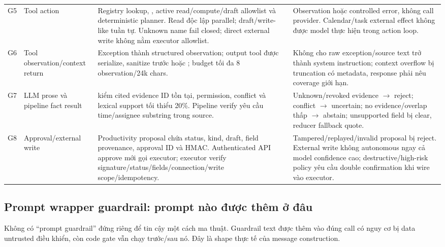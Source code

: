 \documentclass[11pt,a4paper]{article}
\newcommand{\code}[1]{\texttt{\detokenize{#1}}}
\begin{document}
\begin{longtable}{p{1.0cm}p{2.75cm}p{3.55cm}p{4.55cm}}
G5 & Tool action & Registry lookup, \code{evaluate\_tool()}, active read/compute/draft allowlist và deterministic planner. Read độc lập parallel; draft/write-like tuần tự. Unknown name fail closed; direct external write không nằm executor allowlist. & Observation \code{blocked} hoặc controlled error, không call provider. Calendar/task external effect không được model thực hiện trong action loop. \\
G6 & Tool observation/context return & Exception thành structured observation; output tool được serialize, sanitize trước \code{<observations>} hoặc \code{<tu\_lieu>}; budget tối đa 8 observation/24k chars. & Không cho raw exception/source text trở thành system instruction; context overflow bị truncation có metadata, response phải nêu coverage giới hạn. \\
G7 & LLM prose và pipeline fact result & \code{ground\_candidate()} kiểm cited evidence ID tồn tại, permission, conflict và lexical support tối thiểu 20\%. Pipeline verify yêu cầu time/assignee substring trong source. & Unknown/revoked evidence $\rightarrow$ reject; conflict $\rightarrow$ uncertain; no evidence/overlap thấp $\rightarrow$ abstain; unsupported field bị clear, reducer fallback quote. \\
G8 & Approval/external write & Productivity proposal chứa status, kind, draft, field provenance, approval ID và HMAC. Authenticated API approve mới gọi executor; executor verify signature/status/fields/connection/write scope/idempotency. & Tampered/replayed/invalid proposal bị reject. External write không autonomous ngay cả model confidence cao; destructive/high-risk policy yêu cầu double confirmation khi wire vào executor. \\
\bottomrule
\end{longtable}

\subsection{Prompt wrapper guardrail: prompt nào được thêm ở đâu}

Không có ``prompt guardrail'' đứng riêng để tin cậy một cách ma thuật. Guardrail text được thêm vào đúng call có nguy cơ bị data untrusted điều khiển, còn code gate vẫn chạy trước/sau nó. Đây là shape thực tế của message construction.
\end{document}
